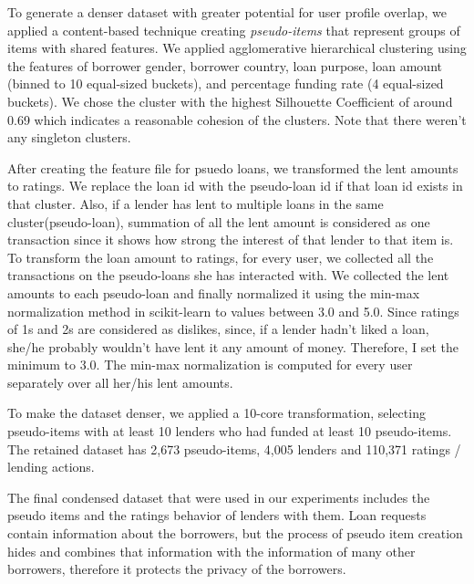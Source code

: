     To generate a denser dataset with greater potential for user profile overlap, we applied a content-based technique creating \textit{pseudo-items} that represent groups of items with shared features. We applied agglomerative hierarchical clustering \cite{rokach2005clustering} using the features of borrower gender, borrower country, loan purpose, loan amount (binned to 10 equal-sized buckets), and percentage funding rate (4 equal-sized buckets). We chose the cluster with the highest Silhouette Coefficient \cite{rousseeuw1987silhouettes} of around 0.69 which indicates a reasonable cohesion of the clusters. Note that there weren't any singleton clusters.
    
    After creating the feature file for psuedo loans, we transformed the lent amounts to ratings. We replace the loan id with the pseudo-loan id if that loan id exists in that cluster. Also, if a lender has lent to multiple loans in the same cluster(pseudo-loan), summation of all the lent amount is considered as one transaction since it shows how strong the interest of that lender to that item is.
    To transform the loan amount to ratings, for every user, we collected all the transactions on the pseudo-loans she has interacted with. We collected the lent amounts to each pseudo-loan and finally normalized it using the min-max normalization method in scikit-learn \cite{scikit-learn} to values between 3.0 and 5.0. Since ratings of 1s and 2s are considered as dislikes, since, if a lender hadn't liked a loan, she/he probably wouldn't have lent it any amount of money. Therefore, I set the minimum to 3.0. The min-max normalization is computed for every user separately over all her/his lent amounts.

    To make the dataset denser, we applied a 10-core transformation, selecting pseudo-items with at least 10 lenders who had funded at least 10 pseudo-items. The retained dataset has 2,673 pseudo-items, 4,005 lenders and 110,371 ratings / lending actions.
    

    The final condensed dataset that were used in our experiments includes the pseudo items and the ratings behavior of lenders with them. Loan requests contain information about the borrowers, but the process of pseudo item creation hides and combines that information with the information of many other borrowers, therefore it protects the privacy of the borrowers. 
    
